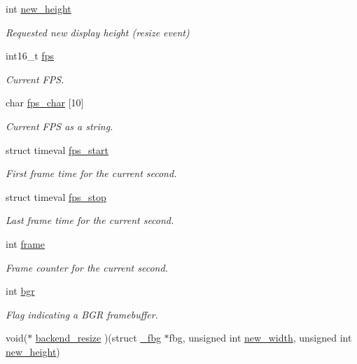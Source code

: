 \begin{DoxyCompactItemize}
int \hyperlink{struct__fbg_a509aa5f8f0a94d8313bb4da777aa64bc}{new\+\_\+height}
\begin{DoxyCompactList}\small\item\em Requested new display height (resize event) \end{DoxyCompactList}\item 
int16\+\_\+t \hyperlink{struct__fbg_a64b16363bc48d1e19141df2e242930a9}{fps}
\begin{DoxyCompactList}\small\item\em Current F\+PS. \end{DoxyCompactList}\item 
char \hyperlink{struct__fbg_af447e6ed58d893989c8dad075807a79b}{fps\+\_\+char} \mbox{[}10\mbox{]}
\begin{DoxyCompactList}\small\item\em Current F\+PS as a string. \end{DoxyCompactList}\item 
struct timeval \hyperlink{struct__fbg_a07d7bb827a7595c956fe22c2d65bba33}{fps\+\_\+start}
\begin{DoxyCompactList}\small\item\em First frame time for the current second. \end{DoxyCompactList}\item 
struct timeval \hyperlink{struct__fbg_ade17a45bbc82bef326857c2837cdf66c}{fps\+\_\+stop}
\begin{DoxyCompactList}\small\item\em Last frame time for the current second. \end{DoxyCompactList}\item 
int \hyperlink{struct__fbg_aa3ef83f919d12e680f8c64006b441454}{frame}
\begin{DoxyCompactList}\small\item\em Frame counter for the current second. \end{DoxyCompactList}\item 
int \hyperlink{struct__fbg_a5844c5bf4789117cbc0c972ff160b338}{bgr}
\begin{DoxyCompactList}\small\item\em Flag indicating a B\+GR framebuffer. \end{DoxyCompactList}\item 
void($\ast$ \hyperlink{struct__fbg_aef07a92ae059ea2a43653f4d0c5d928e}{backend\+\_\+resize} )(struct \hyperlink{struct__fbg}{\+\_\+fbg} $\ast$fbg, unsigned int \hyperlink{struct__fbg_a95859bd418a5cfff155cdb1421d295ef}{new\+\_\+width}, unsigned int \hyperlink{struct__fbg_a509aa5f8f0a94d8313bb4da777aa64bc}{new\+\_\+height})

\end{DoxyCompactItemize}
